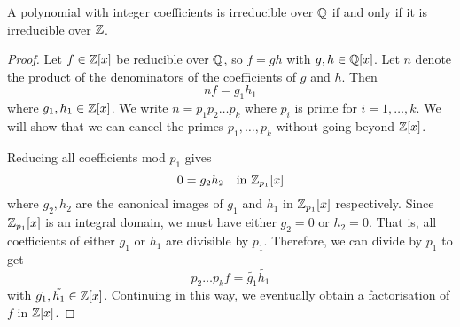 \begin{lemma}[Gauss]
	A polynomial with integer coefficients is irreducible over $\mathbb{Q}$ if and only if it is irreducible over $\mathbb{Z}$.
	\begin{proof}
		Let $f \in \mathbb{Z}[x]$ be reducible over $\mathbb{Q}$, so $f = gh$ with $g, h \in \mathbb{Q}[x]$. Let $n$ denote the product of the denominators of the coefficients of $g$ and $h$. Then
		\[
			nf = g_1 h_1
		\]
		where $g_1, h_1 \in \mathbb{Z}[x]$. We write $n = p_1 p_2 \dots p_k$ where $p_i$ is prime for $i = 1, \dots, k$. We will show that we can cancel the primes $p_1, \dots, p_k$ without going beyond $\mathbb{Z}[x]$.
		
		Reducing all coefficients mod $p_1$ gives
		\[
			0 = g_2 h_2 \quad \text{in } \mathbb{Z}_{p_1}[x]
		\]
		where $g_2, h_2$ are the canonical images of $g_1$ and $h_1$ in $\mathbb{Z}_{p_1}[x]$ respectively. Since $\mathbb{Z}_{p_1}[x]$ is an integral domain, we must have either $g_2 = 0$ or $h_2 = 0$. That is, all coefficients of either $g_1$ or $h_1$ are divisible by $p_1$. Therefore, we can divide by $p_1$ to get
		\[
			p_2 \dots p_k f = \tilde{g_1}\tilde{h_1}
		\]
		with $\tilde{g_1}, \tilde{h_1} \in \mathbb{Z}[x]$. Continuing in this way, we eventually obtain a factorisation of $f$ in $\mathbb{Z}[x]$.
	\end{proof}
\end{lemma}

